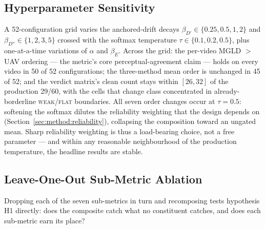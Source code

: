 \subsection{Hyperparameter Sensitivity}
\label{sec:exp:sensitivity}

A 52-configuration grid varies the anchored-drift decays $\beta_{D'} \in
\{0.25, 0.5, 1, 2\}$ and $\beta_{D''} \in \{1, 2, 3, 5\}$ crossed with the
softmax temperature $\tau \in \{0.1, 0.2, 0.5\}$, plus one-at-a-time
variations of $\alpha$ and $\beta_E$. Across the grid: the per-video
MGLD $>$ UAV ordering --- the metric's core perceptual-agreement claim ---
holds on every video in 50 of 52 configurations; the three-method mean order
is unchanged in 45 of 52; and the verdict matrix's clean count stays within
$[26, 32]$ of the production 29/60, with the cells that change class
concentrated in already-borderline \textsc{weak}/\textsc{flat} boundaries.
All seven order changes occur at $\tau = 0.5$: softening the softmax dilutes
the reliability weighting that the design depends on
(Section~\ref{sec:method:reliability}), collapsing the composition toward an
ungated mean. Sharp reliability weighting is thus a load-bearing choice, not
a free parameter --- and within any reasonable neighbourhood of the
production temperature, the headline results are stable.

\subsection{Leave-One-Out Sub-Metric Ablation}
\label{sec:exp:loo}

Dropping each of the seven sub-metrics in turn and recomposing tests
hypothesis H1 directly: does the composite catch what no constituent catches,
and does each sub-metric earn its place?

